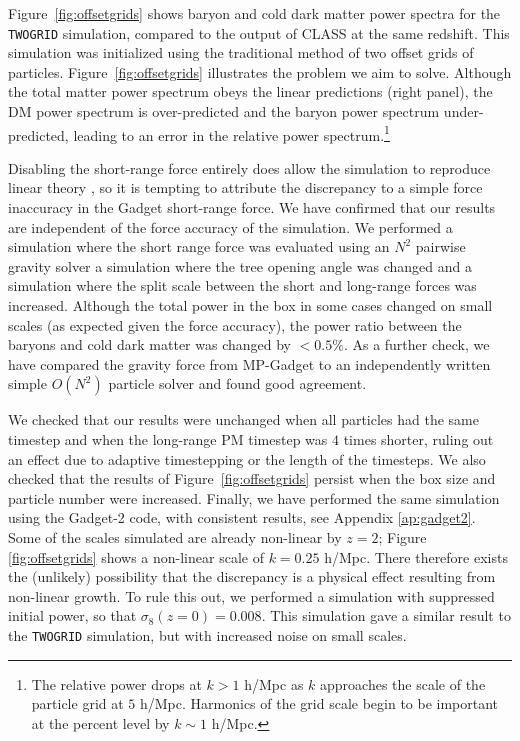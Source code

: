 \documentclass[a4paper,11pt]{article}
\begin{document}
Figure~\ref{fig:offsetgrids} shows baryon and cold dark matter power spectra for the \texttt{TWOGRID} simulation, compared to the output of CLASS at the same redshift. This simulation was initialized using the traditional method of two offset grids of particles. Figure~\ref{fig:offsetgrids} illustrates the problem we aim to solve. Although the total matter power spectrum obeys the linear predictions (right panel), the DM power spectrum is over-predicted and the baryon power spectrum under-predicted, leading to an error in the relative power spectrum.\footnote{The relative power drops at $k > 1$ h/Mpc as $k$ approaches the scale of the particle grid at $5$ h/Mpc. Harmonics of the grid scale begin to be important at the percent level by $k \sim 1$ h/Mpc.}

Disabling the short-range force entirely does allow the simulation to reproduce linear theory \cite{Angulo:2013}, so it is tempting to attribute the discrepancy to a simple force inaccuracy in the Gadget short-range force. We have confirmed that our results are independent of the force accuracy of the simulation. We performed a simulation where the short range force was evaluated using an $N^2$ pairwise gravity solver a simulation where the tree opening angle was changed and a simulation where the split scale between the short and long-range forces was increased. Although the total power in the box in some cases changed on small scales (as expected given the force accuracy), the power ratio between the baryons and cold dark matter was changed by $<0.5\%$. As a further check, we have compared the gravity force from MP-Gadget to an independently written simple $O(N^2)$ particle solver and found good agreement.

We checked that our results were unchanged when all particles had the same timestep and when the long-range PM timestep was $4$ times shorter, ruling out an effect due to adaptive timestepping or the length of the timesteps. We also checked that the results of Figure~\ref{fig:offsetgrids} persist when the box size and particle number were increased. Finally, we have performed the same simulation using the Gadget-2 code, with consistent results, see Appendix \ref{ap:gadget2}. Some of the scales simulated are already non-linear by $z=2$; Figure \ref{fig:offsetgrids} shows a non-linear scale of $k = 0.25$ h/Mpc. There therefore exists the (unlikely) possibility that the discrepancy is a physical effect resulting from non-linear growth. To rule this out, we performed a simulation with suppressed initial power, so that $\sigma_8(z=0) = 0.008$. This simulation gave a similar result to the \texttt{TWOGRID} simulation, but with increased noise on small scales.
\end{document}
